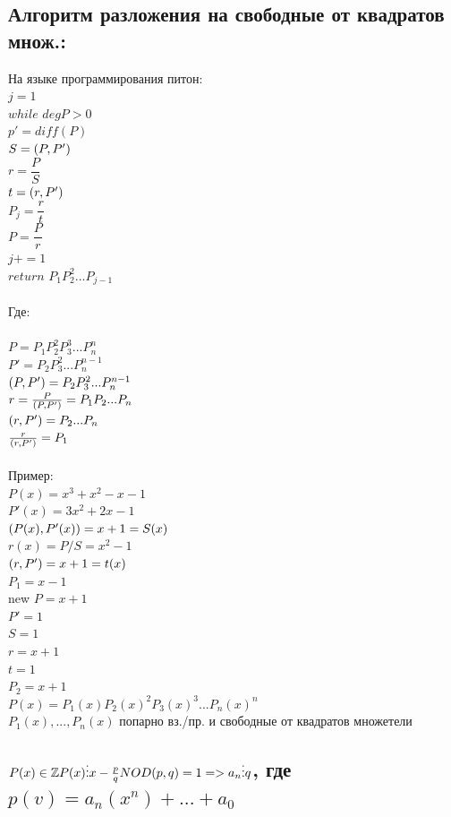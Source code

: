 \documentclass[12pt]{article}
\let\gcd\relax
\DeclareMathOperator{\gcd}{НОД}
\begin{document}
    \subsection{Алгоритм разложения на свободные от  квадратов множ.:}
    \noindent На языке программирования питон:
    \\$j=1$
\\$while$ $deg P>0$
    \\\indent$p' = diff(P)$
    \\\indent$S=\gcd(P,P')$
    \\\indent$r = \dfrac{P}{S}$
    \\\indent$t = \gcd(r,P')$
    \\\indent$P_j=\dfrac{r}{t}$
    \\\indent$P=\dfrac{P}{r}$
    \\\indent$j+= 1$
    \\$return$ $P_1P^2_2...P_{j-1}$
\\
\\Где:
\\
\\$P=P_1P^2_2P^3_3...P^n_n$
    \\$P'=P_2P^2_3...P_n^{n-1}$
\\$\gcd(P,P')=P_2P_3^2...P_n^{n-1}$
    \\$r=\frac{P}{\gcd(P,P')}=P_1P_2...P_n$
\\$\gcd(r,P')=P_2...P_n$
    \\$\frac{r}{\gcd(r,P')}=P_1$
\\
\\Пример:
\\$P(x)=x^3+x^2-x-1$
    \\$P'(x)=3x^2+2x-1$
\\$\gcd(P(x),P'(x))=x+1=S(x)$
    \\$r(x)= P/S=x^2-1$
\\$\gcd(r,P')=x+1=t(x)$
    \\$P_1=x-1$
\\new $P=x+1$
\\$P'=1$
    \\$S=1$
\\$r = x+1$
    \\$t = 1$
\\$P_2=x+1$
    \\$P(x) = P_1(x)P_2(x)^2P_3(x)^3...P_n(x)^n$
\\$P_1(x),...,P_n(x)$ попарно вз./пр. и свободные от квадратов множетели
    \subsection{$P(x) \in\mathbb{Z} P(x)\vdots x - \frac{p}{q}\\NOD(p,q)=1 => a_n \vdots q $, где $p(v)=a_n(x^n)+...+a_0$}
\end{document}
